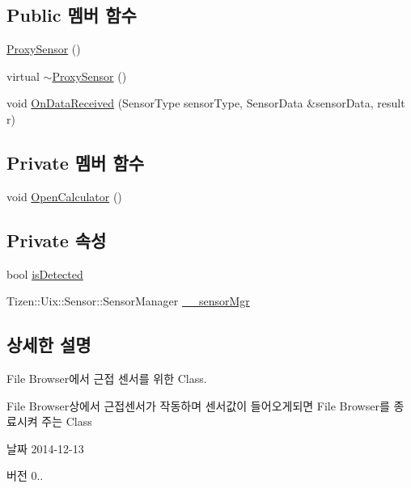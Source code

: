 \subsection*{Public 멤버 함수}
\begin{DoxyCompactItemize}
\item 
\hyperlink{class_proxy_sensor_ab6f0509bcde7aa515c6c2a4cf7180887}{Proxy\+Sensor} ()
\item 
virtual \hyperlink{class_proxy_sensor_a26bdf3f2477f1ea84db56e4d4ebfc26e}{$\sim$\+Proxy\+Sensor} ()
\item 
void \hyperlink{class_proxy_sensor_a21570507e6392e6e8d98d06997a4e80e}{On\+Data\+Received} (Sensor\+Type sensor\+Type, Sensor\+Data \&sensor\+Data, result r)
\end{DoxyCompactItemize}
\subsection*{Private 멤버 함수}
\begin{DoxyCompactItemize}
\item 
void \hyperlink{class_proxy_sensor_a0843719b4dd18b7d0765996c2c078ff8}{Open\+Calculator} ()
\end{DoxyCompactItemize}
\subsection*{Private 속성}
\begin{DoxyCompactItemize}
\item 
bool \hyperlink{class_proxy_sensor_a508bdca3572c905679378d23787b0acc}{is\+Detected}
\item 
Tizen\+::\+Uix\+::\+Sensor\+::\+Sensor\+Manager \hyperlink{class_proxy_sensor_afa7f75c2ad489dd958cf07c8d11196a0}{\+\_\+\+\_\+sensor\+Mgr}
\end{DoxyCompactItemize}


\subsection{상세한 설명}
File Browser에서 근접 센서를 위한 Class. 

File Browser상에서 근접센서가 작동하며 센서값이 들어오게되면 File Browser를 종료시켜 주는 Class \begin{DoxyDate}{날짜}
2014-\/12-\/13 
\end{DoxyDate}
\begin{DoxyVersion}{버전}
0.. 
\end{DoxyVersion}


